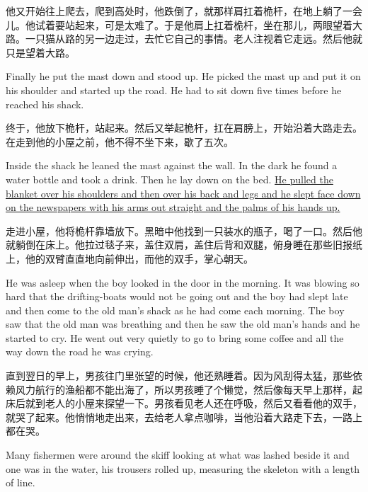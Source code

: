 \begin{paracol}{2}
\switchcolumn

他又开始往上爬去，爬到高处时，他跌倒了，就那样肩扛着桅杆，在地上躺了一会儿。他试着要站起来，可是太难了。于是他肩上扛着桅杆，坐在那儿，两眼望着大路。一只猫从路的另一边走过，去忙它自己的事情。老人注视着它走远。然后他就只是望着大路。

\switchcolumn*

Finally he put the mast down and stood up. He picked the mast up and put it
on his shoulder and started up the road. He had to sit down five times
before he reached his shack.

\switchcolumn

终于，他放下桅杆，站起来。然后又举起桅杆，扛在肩膀上，开始沿着大路走去。在走到他的小屋之前，他不得不坐下来，歇了五次。

\switchcolumn*

Inside the shack he leaned the mast against the wall. In the dark he found a
water bottle and took a drink. Then he lay down on the bed. \uline{He pulled the
blanket over his shoulders and then over his back and legs and he slept face
down on the newspapers with his arms out straight and the palms of his hands
up.}

\switchcolumn

走进小屋，他将桅杆靠墙放下。黑暗中他找到一只装水的瓶子，喝了一口。然后他就躺倒在床上。他拉过毯子来，盖住双肩，盖住后背和双腿，俯身睡在那些旧报纸上，他的双臂直直地向前伸出，而他的双手，掌心朝天。

\switchcolumn*

He was asleep when the boy looked in the door in the morning. It was
blowing so hard that the drifting-boats would not be going out and the boy
had slept late and then come to the old man's shack as he had come each
morning. The boy saw that the old man was breathing and then he saw the old
man's hands and he started to cry. He went out very quietly to go to bring
some coffee and all the way down the road he was crying.

\switchcolumn

直到翌日的早上，男孩往门里张望的时候，他还熟睡着。因为风刮得太猛，那些依赖风力航行的渔船都不能出海了，所以男孩睡了个懒觉，然后像每天早上那样，起床后就到老人的小屋来探望一下。男孩看见老人还在呼吸，然后又看看他的双手，就哭了起来。他悄悄地走出来，去给老人拿点咖啡，当他沿着大路走下去，一路上都在哭。

\switchcolumn*

Many fishermen were around the skiff looking at what was lashed beside it
and one was in the water, his trousers rolled up, \gls{measuring} the
\gls{skeleton} with a length of line.


\end{paracol}
